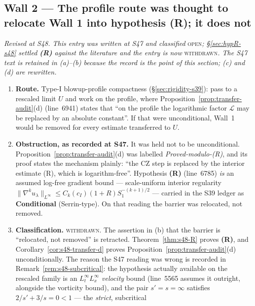 \documentclass[11pt]{article}
\theoremstyle{definition}
\theoremstyle{remark}
\begin{document}
\subsection{Wall 2 --- The profile route was thought to relocate Wall 1 into
  hypothesis \textup{(R)}; it does not}
\label{subsec:wall2-R}

\emph{Revised at S48. This entry was written at S47 and classified}
\textsc{open}\emph{; \S\ref{sec:hypR-s48} settled \textbf{(R)} against the
literature and the entry is now} \textsc{withdrawn}\emph{. The S47 text is
retained in (a)--(b) because the record is the point of this section; (c)
and (d) are rewritten.}

\begin{enumerate}[label=(\alph*),leftmargin=2.2em]
  \item \textbf{Route.} Type-I blowup-profile compactness
    (\S\ref{sec:rigidity-s39}): pass to a rescaled limit $U$ and work on the
    profile, where Proposition~\ref{prop:transfer-audit}(d) (line~6941)
    states that ``on the profile the logarithmic factor $\mathcal{L}$ may be
    replaced by an absolute constant''. If that were unconditional, Wall~1
    would be removed for every estimate transferred to $U$.
  \item \textbf{Obstruction, as recorded at S47.} It was held not to be
    unconditional. Proposition~\ref{prop:transfer-audit}(d) was labelled
    \emph{Proved-modulo-\textup{(R)}}, and its proof states the mechanism
    plainly: ``the CZ step is replaced by the interior estimate (R), which is
    logarithm-free''. Hypothesis \textbf{(R)} (line~6785) \emph{is} an
    assumed log-free gradient bound --- scale-uniform interior regularity
    $\|\nabla^k u_\lambda\|_{L^\infty}\leq C_k(c_I)(1+R)S_1^{-(k+1)/2}$ ---
    carried in the S39 ledger as \textbf{Conditional} (Serrin-type). On that
    reading the barrier was relocated, not removed.
  \item \textbf{Classification.} \textsc{withdrawn}. The assertion in (b)
    that the barrier is ``relocated, not removed'' is retracted.
    Theorem~\ref{thm:s48-R} proves \textbf{(R)}, and
    Corollary~\ref{cor:s48-transfer-d} proves
    Proposition~\ref{prop:transfer-audit}(d) unconditionally. The reason the
    S47 reading was wrong is recorded in Remark~\ref{rem:s48-subcritical}:
    the hypothesis actually available on the rescaled family is an
    $L^\infty_tL^\infty_x$ \emph{velocity} bound (line~5565 assumes it
    outright, alongside the vorticity bound), and the pair
    $s'=s=\infty$ satisfies $2/s'+3/s=0<1$ --- the \emph{strict}, subcritical

\end{enumerate}
\end{document}
